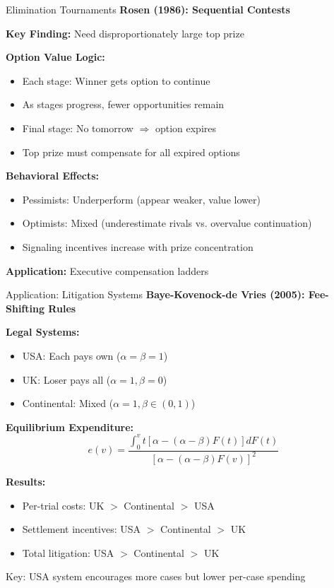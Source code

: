 \documentclass[xcolor={x11names}]{beamer}
\begin{document}
\begin{frame}{Elimination Tournaments}
\textbf{Rosen (1986): Sequential Contests}

\textbf{Key Finding:} Need disproportionately large top prize

\textbf{Option Value Logic:}
\begin{itemize}
\item Each stage: Winner gets option to continue
\item As stages progress, fewer opportunities remain
\item Final stage: No tomorrow $\Rightarrow$ option expires
\item Top prize must compensate for all expired options
\end{itemize}

\textbf{Behavioral Effects:}
\begin{itemize}
\item Pessimists: Underperform (appear weaker, value lower)
\item Optimists: Mixed (underestimate rivals vs. overvalue continuation)
\item Signaling incentives increase with prize concentration
\end{itemize}

\textbf{Application:} Executive compensation ladders
\end{frame}

\begin{frame}{Application: Litigation Systems}
\textbf{Baye-Kovenock-de Vries (2005): Fee-Shifting Rules}

\textbf{Legal Systems:}
\begin{itemize}
\item USA: Each pays own ($\alpha = \beta = 1$)
\item UK: Loser pays all ($\alpha = 1, \beta = 0$)
\item Continental: Mixed ($\alpha = 1, \beta \in (0,1)$)
\end{itemize}

\textbf{Equilibrium Expenditure:}
$$e(v) = \frac{\int_0^v t[\alpha - (\alpha-\beta)F(t)]dF(t)}{[\alpha - (\alpha-\beta)F(v)]^2}$$

\textbf{Results:}
\begin{itemize}
\item Per-trial costs: UK $>$ Continental $>$ USA
\item Settlement incentives: USA $>$ Continental $>$ UK
\item Total litigation: USA $>$ Continental $>$ UK
\end{itemize}

Key: USA system encourages more cases but lower per-case spending
\end{frame}
\end{document}
